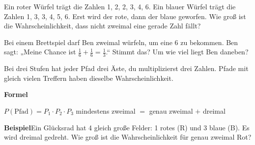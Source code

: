 \documentclass[11pt]{article}
\makeatletter
\newcommand{\aufg}[3]{\par\noindent\makebox[0pt][r]{#3}\begin{minipage}[t]{\linewidth}#1\end{minipage}\par}
\newcommand{\nr}[1]{\makebox[7mm][l]{\textbf{#1}}}
\newlength{\kr}
\newcommand{\karomerk}[2]{\protected@write\@auxout{}{\string\karoseite{#1}{#2}{\thepage}}}
\newcommand{\karoseite}[3]{\expandafter\xdef\csname karo@#1@#2\endcsname{#3}}
\makeatother
\begin{document}
\aufg{\nr{3.}Ein roter Würfel trägt die Zahlen 1, 2, 2, 3, 4, 6. Ein blauer Würfel trägt die Zahlen 1, 3, 3, 4, 5, 6. Erst wird der rote, dann der blaue geworfen. Wie groß ist die Wahrscheinlichkeit, dass nicht zweimal eine gerade Zahl fällt?}{}{}
\medskip
\aufg{\nr{4.}Bei einem Brettspiel darf Ben zweimal würfeln, um eine 6 zu bekommen. Ben sagt: „Meine Chance ist $\frac{1}{6} + \frac{1}{6} = \frac{1}{3}$.“ Stimmt das? Um wie viel liegt Ben daneben?}{}{{\scriptsize\color{mbgrau}Ziel\hspace{2mm}}}
\medskip
\par\vspace{3mm}\setlength{\kr}{\dimexpr\pagegoal-\pagetotal-10mm\relax}%
\ifdim\kr>12mm\karomerk{k}{C}\noindent{\scriptsize\color{mbgrau}Platz zum Rechnen}\par\nointerlineskip\vspace{1mm}\noindent
\begin{tikzpicture}\clip (0,0) rectangle ({\linewidth-0.5mm},\kr);\draw[black!16,line width=0.3pt,step=5mm] (0,0) grid (\linewidth,\kr);\end{tikzpicture}\fi\par
\clearpage\label{s:D}\noindent\colorbox{black!12}{}\hspace{3mm}{\Large\bfseries Drei Stufen}\par\smallskip
\noindent Bei drei Stufen hat jeder Pfad drei Äste, du multiplizierst drei Zahlen. Pfade mit gleich vielen Treffern haben dieselbe Wahrscheinlichkeit.\par\medskip
\noindent\textbf{Formel}\par\nopagebreak\noindent\hspace*{4mm}\begin{minipage}{\dimexpr\linewidth-4mm\relax}$P(\text{Pfad}) = P_1 \cdot P_2 \cdot P_3$ \qquad mindestens zweimal $=$ genau zweimal $+$ dreimal\end{minipage}\par\medskip
\noindent\textbf{Beispiel}\quad Ein Glücksrad hat 4 gleich große Felder: 1 rotes (R) und 3 blaue (B). Es wird dreimal gedreht. Wie groß ist die Wahrscheinlichkeit für genau zweimal Rot?\par\smallskip
\end{document}
